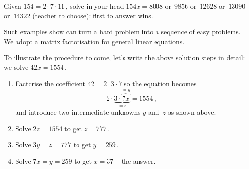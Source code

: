 \begin{example} \label{eg:}
Given \(154=2\cdot7\cdot11\)\,, solve in your head \(154x=8008\) or~\(9856\) or~\(12628\) or~\(13090\) or~\(14322\) (teacher to choose): first to answer wins.
\end{example}

Such examples show  can turn a hard problem into a sequence of easy problems.  
We adopt a matrix factorisation for general linear equations.  

To illustrate the procedure to come, let's write the above solution steps in detail: we solve \(42x=1554\)\,.
\begin{enumerate}
\item Factorise the coefficient \(42=2\cdot3\cdot7\) so the equation becomes  
\begin{equation*}
2\cdot\underbrace{3\cdot\overbrace{7x}^{=y}}_{=z}=1554\,,
\end{equation*}
and introduce two intermediate unknowns \(y\) and~\(z\) as shown above.
\item Solve \(2z=1554\) to get \(z=777\)\,.
\item Solve \(3y=z=777\) to get \(y=259\)\,.
\item Solve \(7x=y=259\) to get \(x=37\)\,---the answer.
\end{enumerate}

